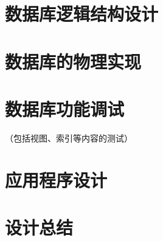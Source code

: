 \documentclass{myreport}
\begin{document}
\section{数据库逻辑结构设计}

\section{数据库的物理实现}

\section{数据库功能调试}
（包括视图、索引等内容的测试）

\section{应用程序设计}

\section{设计总结}





\nocite{silberschatz1997database} %
\nocite{sqldbm} %
\nocite{pyqt5} %
\nocite{tinyint} %
\end{document}
